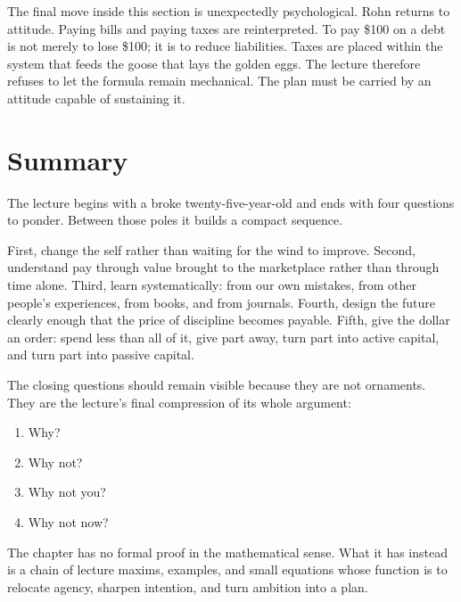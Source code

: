The final move inside this section is unexpectedly psychological. Rohn returns to attitude. Paying bills and paying taxes are reinterpreted. To pay \$100 on a debt is not merely to lose \$100; it is to reduce liabilities. Taxes are placed within the system that feeds the goose that lays the golden eggs. The lecture therefore refuses to let the formula remain mechanical. The plan must be carried by an attitude capable of sustaining it.

\section{Summary}

The lecture begins with a broke twenty-five-year-old and ends with four questions to ponder. Between those poles it builds a compact sequence.

First, change the self rather than waiting for the wind to improve. Second, understand pay through value brought to the marketplace rather than through time alone. Third, learn systematically: from our own mistakes, from other people's experiences, from books, and from journals. Fourth, design the future clearly enough that the price of discipline becomes payable. Fifth, give the dollar an order: spend less than all of it, give part away, turn part into active capital, and turn part into passive capital.

The closing questions should remain visible because they are not ornaments. They are the lecture's final compression of its whole argument:
\begin{enumerate}
\item Why?
\item Why not?
\item Why not you?
\item Why not now?
\end{enumerate}
The chapter has no formal proof in the mathematical sense. What it has instead is a chain of lecture maxims, examples, and small equations whose function is to relocate agency, sharpen intention, and turn ambition into a plan.